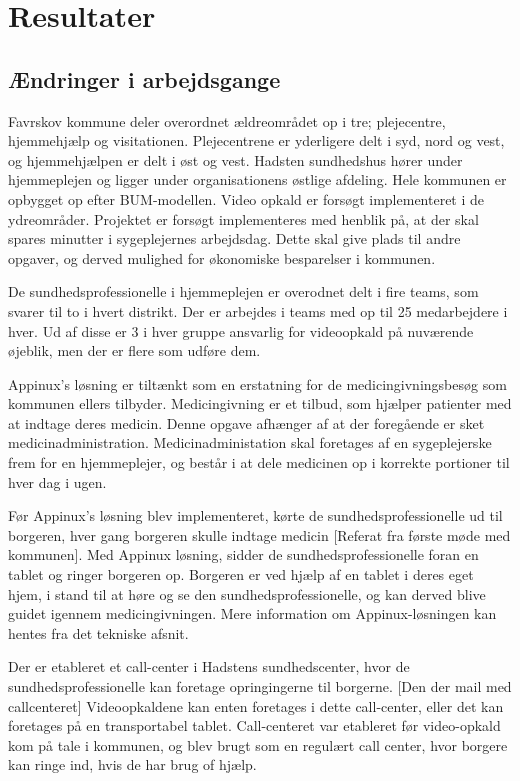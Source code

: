 \section{Resultater}
\subsection{Ændringer i arbejdsgange}
Favrskov kommune deler overordnet ældreområdet op i tre; plejecentre, hjemmehjælp og visitationen. Plejecentrene er yderligere delt i syd, nord og vest, og hjemmehjælpen er delt i øst og vest. Hadsten sundhedshus hører under hjemmeplejen og ligger under organisationens østlige afdeling. Hele kommunen er opbygget op efter BUM-modellen. Video opkald er forsøgt implementeret i de ydreområder. Projektet er forsøgt implementeres med henblik på, at der skal spares minutter i sygeplejernes arbejdsdag. Dette skal give plads til andre opgaver, og derved mulighed for økonomiske besparelser i kommunen. 

De sundhedsprofessionelle i hjemmeplejen er overodnet delt i fire teams, som svarer til to i hvert distrikt. Der er arbejdes i teams med op til 25 medarbejdere i hver. Ud af disse er 3 i hver gruppe ansvarlig for videoopkald på nuværende øjeblik, men der er flere som udføre dem.  

Appinux’s løsning er tiltænkt som en erstatning for de medicingivningsbesøg som kommunen ellers tilbyder. Medicingivning er et tilbud, som hjælper patienter med at indtage deres medicin. Denne opgave afhænger af at der foregående er sket medicinadministration. Medicinadministation skal foretages af en sygeplejerske frem for en hjemmeplejer, og består i at dele medicinen op i korrekte portioner til hver dag i ugen.

Før Appinux’s løsning blev implementeret, kørte de sundhedsprofessionelle ud til borgeren, hver gang borgeren skulle indtage medicin [Referat fra første møde med kommunen]. Med Appinux løsning, sidder de sundhedsprofessionelle foran en tablet og ringer borgeren op. Borgeren er ved hjælp af en tablet i deres eget hjem, i stand til at høre og se den sundhedsprofessionelle, og kan derved blive guidet igennem medicingivningen. Mere information om Appinux-løsningen kan hentes fra det tekniske afsnit. 

Der er etableret et call-center i Hadstens sundhedscenter, hvor de sundhedsprofessionelle kan foretage opringingerne til borgerne. [Den der mail med callcenteret] Videoopkaldene kan enten foretages i dette call-center, eller det kan foretages på en transportabel tablet. Call-centeret var etableret før video-opkald kom på tale i kommunen, og blev brugt som en regulært call center, hvor borgere kan ringe ind, hvis de har brug of hjælp.


